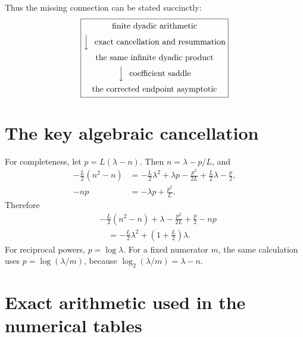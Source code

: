 \documentclass[11pt,oneside]{article}
\theoremstyle{definition}
\theoremstyle{remark}
\begin{document}
Thus the missing connection can be stated succinctly:
\begin{equation*}
 \boxed{\begin{gathered}
 \text{finite dyadic arithmetic}\\
 \Big\downarrow\ \text{ exact cancellation and resummation}\\
 \text{the same infinite dyadic product}\\
 \Big\downarrow\ \text{ coefficient saddle}\\
 \text{the corrected endpoint asymptotic}
 \end{gathered}}
\end{equation*}

\appendix

\section{The key algebraic cancellation}
\label{app:algebra}

For completeness, let $p=L(\lambda-n)$.  Then $n=\lambda-p/L$, and
\begin{align*}
 -\frac L2(n^2-n)
 &=-\frac L2\lambda^2+\lambda p-\frac{p^2}{2L}
 +\frac L2\lambda-\frac p2,\\
 -np&=-\lambda p+\frac{p^2}{L}.
\end{align*}
Therefore
\begin{align*}
 &-\frac L2(n^2-n)+\lambda-\frac{p^2}{2L}+\frac p2-np\\
 &\quad=-\frac L2\lambda^2+
 \left(1+\frac L2\right)\lambda.
\end{align*}
For reciprocal powers, $p=\log\lambda$.  For a fixed numerator $m$, the same calculation uses
$p=\log(\lambda/m)$, because
$\log_2(\lambda/m)=\lambda-n$.

\section{Exact arithmetic used in the numerical tables}
\label{app:numerics}
\end{document}
